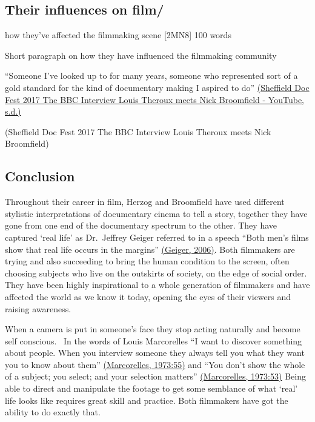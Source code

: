 \documentclass[
]{book}
\begin{document}
\hypertarget{their-influences-on-film}{%
\subsection{Their influences on film/~}\label{their-influences-on-film}}

how they've affected the filmmaking scene {[}2MN8{]} 100 words

Short paragraph on how they have influenced the filmmaking community

``Someone I've looked up to for many years, someone who represented sort of a gold standard for the kind of documentary making I aspired to do'' \href{https://paperpile.com/c/SdLVV0/YJfg}{(Sheffield Doc Fest 2017 The BBC Interview Louis Theroux meets Nick Broomfield - YouTube, s.d.)}

(Sheffield Doc Fest 2017 The BBC Interview Louis Theroux meets Nick Broomfield)

\hypertarget{conclusion}{%
\subsection{Conclusion}\label{conclusion}}

Throughout their career in film, Herzog and Broomfield have used different stylistic interpretations of documentary cinema to tell a story, together they have gone from one end of the documentary spectrum to the other. They have captured `real life' as Dr.~Jeffrey Geiger referred to in a speech ``Both men's films show that real life occurs in the margins'' \href{https://paperpile.com/c/SdLVV0/kmPU}{(Geiger, 2006)}. Both filmmakers are trying and also succeeding to bring the human condition to the screen, often choosing subjects who live on the outskirts of society, on the edge of social order. They have been highly inspirational to a whole generation of filmmakers and have affected the world as we know it today, opening the eyes of their viewers and raising awareness.

When a camera is put in someone's face they stop acting naturally and become self conscious.~ In the words of Louis Marcorelles ``I want to discover something about people. When you interview someone they always tell you what they want you to know about them'' \href{https://paperpile.com/c/SdLVV0/Y49G/?locator=55}{(Marcorelles, 1973:55)} and ``You don't show the whole of a subject; you select; and your selection matters'' \href{https://paperpile.com/c/SdLVV0/Y49G/?locator=53}{(Marcorelles, 1973:53)} Being able to direct and manipulate the footage to get some semblance of what `real' life looks like requires great skill and practice. Both filmmakers have got the ability to do exactly that.
\end{document}
